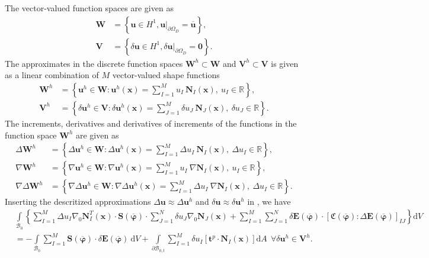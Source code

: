 The vector-valued function spaces are given as 
\begin{align}
\mathbf{W} &= \left\lbrace \mathbf{u} \in H^1, \mathbf{u} \big|_{\partial \Omega_D} = \overline{\mathbf{u}} \right\rbrace, \\
\mathbf{V} &= \left\lbrace \delta\mathbf{u} \in H^1, \delta\mathbf{u} \big|_{\partial \Omega_D} = \mathbf{0} \right\rbrace.
\end{align}
The approximates in the discrete function spaces $\mathbf{W}^h \subset \mathbf{W}$ and $\mathbf{V}^h \subset \mathbf{V}$ is given as a linear combination of $M$ vector-valued shape functions
\begin{align}
\mathbf{W}^h &= \left\lbrace \mathbf{u}^h \in \mathbf{W} : \mathbf{u}^h (\mathbf{x}) = \sum\limits_{I=1}^{M} u_I \ \mathbf{N}_I (\mathbf{x}), \ u_I \in \mathbb{R} \right\rbrace, \nonumber\\
\mathbf{V}^h &= \left\lbrace \delta\mathbf{u}^h \in \mathbf{V} : \delta\mathbf{u}^h (\mathbf{x}) = \sum\limits_{J=1}^{M} \delta u_J \ \mathbf{N}_J (\mathbf{x}), \ \delta u_J \in \mathbb{R} \right\rbrace.
\end{align}
The increments, derivatives and derivatives of increments of the functions in the function space $\mathbf{W}^h$ are given as
\begin{align}
\Delta\mathbf{W}^h &= \left\lbrace \Delta\mathbf{u}^h \in \mathbf{W} : \Delta\mathbf{u}^h (\mathbf{x}) = \sum\limits_{I=1}^{M} \Delta u_I \ \mathbf{N}_I (\mathbf{x}), \ \Delta u_I \in \mathbb{R} \right\rbrace, \\
\nabla\mathbf{W}^h &= \left\lbrace \nabla\mathbf{u}^h \in \mathbf{W} : \nabla\mathbf{u}^h (\mathbf{x}) = \sum\limits_{I=1}^{M} u_I \ \nabla\mathbf{N}_I (\mathbf{x}), \ u_I \in \mathbb{R} \right\rbrace, \\
\nabla \Delta\mathbf{W}^h &= \left\lbrace \nabla \Delta\mathbf{u}^h \in \mathbf{W} : \nabla \Delta\mathbf{u}^h (\mathbf{x}) = \sum\limits_{I=1}^{M} \Delta u_I \ \nabla\mathbf{N}_I (\mathbf{x}), \ \Delta u_I \in \mathbb{R} \right\rbrace.
\end{align}
Inserting the descritized approximations $\Delta \mathbf{u}\approx \Delta \mathbf{u}^h$ and $\delta \mathbf{u} \approx \delta \mathbf{u}^h$ in , we have
\begin{align}
&\int\limits_{\mathcal{B}_0} \left\lbrace \sum\limits_{I=1}^{M} \Delta u_I \nabla_0 \mathbf{N}^T_I(\mathbf{x}) \cdot \mathbf{S}(\overline{\bm{\varphi}}) \cdot \sum\limits_{J=1}^{N} \delta u_J \nabla_0 \mathbf{N}_J(\mathbf{x}) + \sum\limits_{I=1}^{M} \sum\limits_{J=1}^{N} \delta \mathbf{E}(\overline{\bm{\varphi}}) \cdot \left[ \mathfrak{C}(\overline{\bm{\varphi}}) : \Delta \mathbf{E}(\overline{\bm{\varphi}}) \right]_{IJ} \right\rbrace \mathrm{d}V \nonumber \\
&= -\int\limits_{\mathcal{B}_0} \sum\limits_{I=1}^{M} \mathbf{S}(\overline{\bm{\varphi}}) \cdot \delta \mathbf{E}(\overline{\bm{\varphi}}) \ \mathrm{d}V + \int\limits_{\mathcal{\partial B}_{0,t}} \sum\limits_{I=1}^{M} \delta u_I \left[ \mathbf{t}^p \cdot \mathbf{N}_I (\mathbf{x}) \right] \mathrm{d}A\ \ \forall \delta \mathbf{u}^h \in \mathbf{V}^h.
\end{align}
